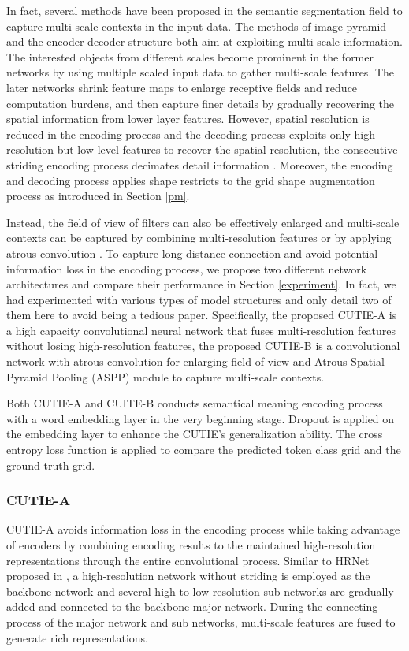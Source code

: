 \documentclass[10pt,twocolumn,letterpaper]{article}
\begin{document}
In fact, several methods have been proposed in the semantic segmentation field to capture multi-scale contexts in the input data. The methods of image pyramid and the encoder-decoder structure both aim at exploiting multi-scale information. The interested objects from different scales become prominent in the former networks by using multiple scaled input data to gather multi-scale features. The later networks shrink feature maps to enlarge receptive fields and reduce computation burdens, and then capture finer details by gradually recovering the spatial information from lower layer features. However, spatial resolution is reduced in the encoding process and the decoding process exploits only high resolution but low-level features to recover the spatial resolution, the consecutive striding encoding process decimates detail information \cite{hrnet}. Moreover, the encoding and decoding process applies shape restricts to the grid shape augmentation process as introduced in Section \ref{pm}. 

Instead, the field of view of filters can also be effectively enlarged and multi-scale contexts can be captured by combining multi-resolution features \cite{hrnet} or by applying atrous convolution \cite{deeplab, deeplabv1, deeplabv3, deeplabv3p}. To capture long distance connection and avoid potential information loss in the encoding process, we propose two different network architectures and compare their performance in Section \ref{experiment}. In fact, we had experimented with various types of model structures and only detail two of them here to avoid being a tedious paper. Specifically, the proposed CUTIE-A is a high capacity convolutional neural network that fuses multi-resolution features without losing high-resolution features, the proposed CUTIE-B is a convolutional network with atrous convolution for enlarging field of view and Atrous Spatial Pyramid Pooling (ASPP) module to capture multi-scale contexts. 

Both CUTIE-A and CUITE-B conducts semantical meaning encoding process with a word embedding layer in the very beginning stage. Dropout is applied on the embedding layer to enhance the CUTIE's generalization ability. The cross entropy loss function is applied to compare the predicted token class grid and the ground truth grid.

\subsubsection{CUTIE-A}
CUTIE-A avoids information loss in the encoding process while taking advantage of encoders by combining encoding results to the maintained high-resolution representations through the entire convolutional process. Similar to HRNet proposed in \cite{hrnet}, a high-resolution network without striding is employed as the backbone network and several high-to-low resolution sub networks are gradually added and connected to the backbone major network. During the connecting process of the major network and sub networks, multi-scale features are fused to generate rich representations.
\end{document}
